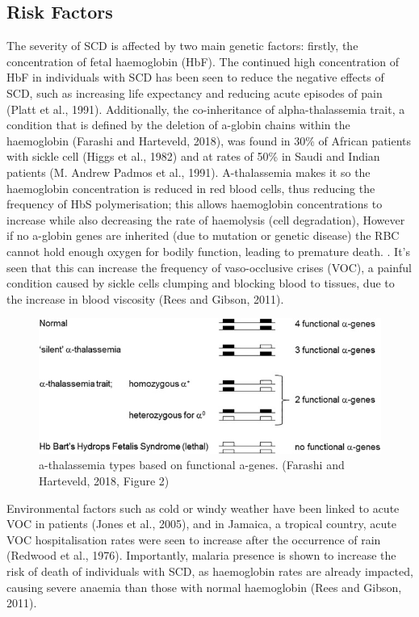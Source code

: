 \documentclass{mva_style}
\begin{document}
\subsection{Risk Factors}
The severity of SCD is affected by two main genetic factors: firstly, the concentration of fetal haemoglobin (HbF). The continued high concentration of HbF in individuals with SCD has been seen to reduce the negative effects of SCD, such as increasing life expectancy and reducing acute episodes of pain (Platt et al., 1991).
Additionally, the co-inheritance of alpha-thalassemia trait, a condition that is defined by the deletion of a-globin chains within the haemoglobin (Farashi and Harteveld, 2018), was found in 30\% of African patients with sickle cell (Higgs et al., 1982) and at rates of 50\% in Saudi and Indian patients (M. Andrew Padmos et al., 1991). A-thalassemia makes it so the haemoglobin concentration is reduced in red blood cells, thus reducing the frequency of HbS polymerisation; this allows haemoglobin concentrations to increase while also decreasing the rate of haemolysis (cell degradation), However if no a-globin genes are inherited (due to mutation or genetic disease) the RBC cannot hold enough oxygen for bodily function, leading to premature death. . It's seen that this can increase the frequency of vaso-occlusive crises (VOC), a painful condition caused by sickle cells clumping and blocking blood to tissues, due to the increase in blood viscosity (Rees and Gibson, 2011).

\begin{figure}
    \centering
    \includegraphics[width=0.8\linewidth]{img/Farashi and Harteveld, 2018, Figure 2.jpg}
    \caption{a-thalassemia types based on functional a-genes. (Farashi and Harteveld, 2018, Figure 2)}
    \label{fig:enter-label}
\end{figure}

Environmental factors such as cold or windy weather have been linked to acute VOC in patients (Jones et al., 2005), and in Jamaica, a tropical country, acute VOC hospitalisation rates were seen to increase after the occurrence of rain (Redwood et al., 1976). Importantly, malaria presence is shown to increase the risk of death of individuals with SCD, as haemoglobin rates are already impacted, causing severe anaemia than those with normal haemoglobin (Rees and Gibson, 2011).
\end{document}
